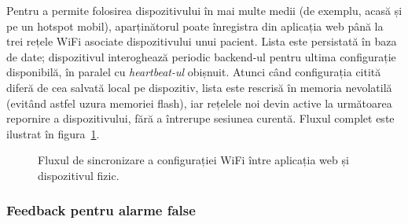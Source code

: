 ﻿\documentclass[12pt,a4paper,twoside]{article}
\begin{document}
Pentru a permite folosirea dispozitivului în mai multe medii (de exemplu, acasă și pe un hotspot mobil), aparținătorul poate înregistra din aplicația web până la trei rețele WiFi asociate dispozitivului unui pacient. Lista este persistată în baza de date; dispozitivul interoghează periodic backend-ul pentru ultima configurație disponibilă, în paralel cu \textit{heartbeat-ul} obișnuit. Atunci când configurația citită diferă de cea salvată local pe dispozitiv, lista este rescrisă în memoria nevolatilă (evitând astfel uzura memoriei flash), iar rețelele noi devin active la următoarea repornire a dispozitivului, fără a întrerupe sesiunea curentă. Fluxul complet este ilustrat în figura~\ref{fig:wifi-flow}.

\begin{figure}[H]
\centering
{}
\caption{Fluxul de sincronizare a configurației WiFi între aplicația web și dispozitivul fizic.}
\label{fig:wifi-flow}
\end{figure}

\subsubsection{Feedback pentru alarme false}
\end{document}

